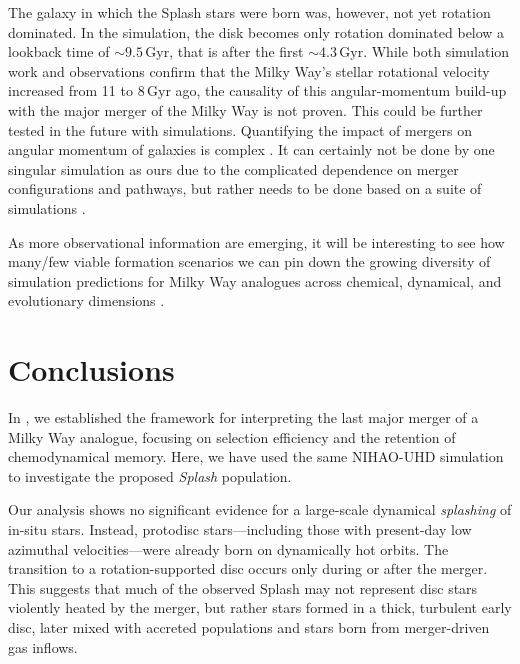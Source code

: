 \documentclass[fleqn,usenatbib]{mnras}
\begin{document}
The galaxy in which the Splash stars were born was, however, not yet rotation dominated. In the simulation, the disk becomes only rotation dominated below a lookback time of $\sim 9.5\,\mathrm{Gyr}$, that is after the first $\sim 4.3\,\mathrm{Gyr}$. While both simulation work and observations \citep[for example][]{MCM2013} confirm that the Milky Way's stellar rotational velocity increased from 11 to $8\,\mathrm{Gyr}$ ago, the causality of this angular-momentum build-up with the major merger of the Milky Way is not proven. This could be further tested in the future with simulations. Quantifying the impact of mergers on angular momentum of galaxies is complex \citep[see for example][]{Lagos2017, Lagos2018}. It can certainly not be done by one singular simulation as ours due to the complicated dependence on merger configurations and pathways, but rather needs to be done based on a suite of simulations \citep[see for example][]{Pillepich2019, SotilloRamos2022}.

As more observational information are emerging, it will be interesting to see how many/few viable formation scenarios we can pin down the growing diversity of simulation predictions for Milky Way analogues across chemical, dynamical, and evolutionary dimensions \citep{Brooks2025}. 

\section{Conclusions}
\label{sec:conclusions}

In , we established the framework for interpreting the last major merger of a Milky Way analogue, focusing on selection efficiency and the retention of chemodynamical memory. Here, we have used the same NIHAO-UHD simulation to investigate the proposed \textit{Splash} population.

Our analysis shows no significant evidence for a large-scale dynamical \textit{splashing} of in-situ stars. Instead, protodisc stars—including those with present-day low azimuthal velocities—were already born on dynamically hot orbits. The transition to a rotation-supported disc occurs only during or after the merger. This suggests that much of the observed Splash may not represent disc stars violently heated by the merger, but rather stars formed in a thick, turbulent early disc, later mixed with accreted populations and stars born from merger-driven gas inflows.
\end{document}

